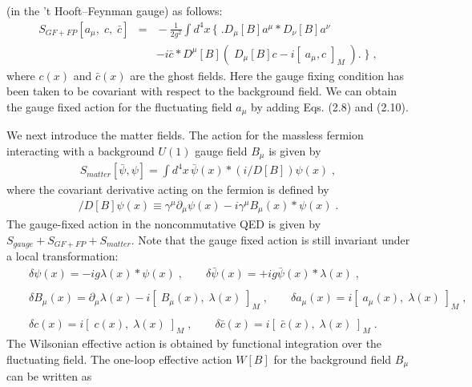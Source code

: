 \documentclass[a4paper,12pt]{article}
\begin{document}
(in the 't Hooft--Feynman gauge) as follows: 
%
%
%
\begin{eqnarray}
S_{GF + FP}[a_{\mu}, \; c, \; \bar{c}] \!\!&=&\!\! -\frac{1}{2g^{2}} 
\int d^{4}x \, \biggl\{\; \biggr. D_{\mu}[B]a^{\mu} \ast D_{\nu}[B]a^{\nu} 
\nonumber \\
& & -i \bar{c} \ast D^{\mu}[B] 
(\; D_{\mu}[B]c-i[\;a_{\mu}, c \;]_{M} \;)
\biggl. \; \biggr\} \;,
\end{eqnarray}
%
where $c(x)$ and $\bar{c}(x)$ are the ghost fields. Here the gauge fixing 
condition has been taken to be covariant with respect to the background field. 
We can obtain the gauge fixed action for the fluctuating field $a_{\mu}$ by 
adding Eqs. (2.8) and (2.10). 


We next introduce the matter fields. The action for the massless fermion 
interacting with a background $U(1)$ gauge field $B_{\mu}$ is given by 
%
%
\begin{eqnarray}
S_{matter}[\bar{\psi}, \psi] = \int d^{4}x \, \bar{\psi}(x) \ast 
(i /\!\!\!\!D[B]) \psi (x) \;, 
\end{eqnarray}
%
where the covariant derivative acting on the fermion is defined 
by \cite{JMGBCPM, CPM, FANS} 
%
%
\begin{eqnarray}
/\!\!\!\!D[B] \psi(x) 
\equiv \gamma^{\mu} \partial_{\mu}\psi(x) -i\gamma^{\mu}B_{\mu}(x) \ast 
\psi(x)\;. 
\end{eqnarray}
%
The gauge-fixed action in the noncommutative QED is given by 
$S_{gauge} + S_{GF + FP} + S_{matter}$. Note that the gauge fixed action is 
still invariant under a local transformation:
%
%
\begin{eqnarray}
& & \delta \psi(x) = -ig \lambda(x) \ast \psi(x)\;, \qquad 
\delta \bar{\psi}(x) = +ig \bar{\psi}(x) \ast \lambda(x)\;, 
\nonumber \\
& & \nonumber \\
& & \delta B_{\mu}(x) = \partial_{\mu}\lambda(x) - 
 i [\;B_{\mu}(x), \; \lambda(x) \;]_{M}
\;, \qquad 
\delta a_{\mu}(x) = i [\;a_{\mu}(x), \; \lambda(x) \;]_{M} \;, \\
& & \nonumber \\
& & \delta c(x) = i [\;c(x), \; \lambda(x) \;]_{M} \;, \qquad 
\delta \bar{c}(x) = i [\;\bar{c}(x), \; \lambda(x) \;]_{M} \;. \nonumber 
\end{eqnarray}
%
The Wilsonian effective action is obtained by functional integration over the 
fluctuating field. The one-loop effective action $W[B]$ for the background 
field $B_{\mu}$ can be written as
\end{document}
